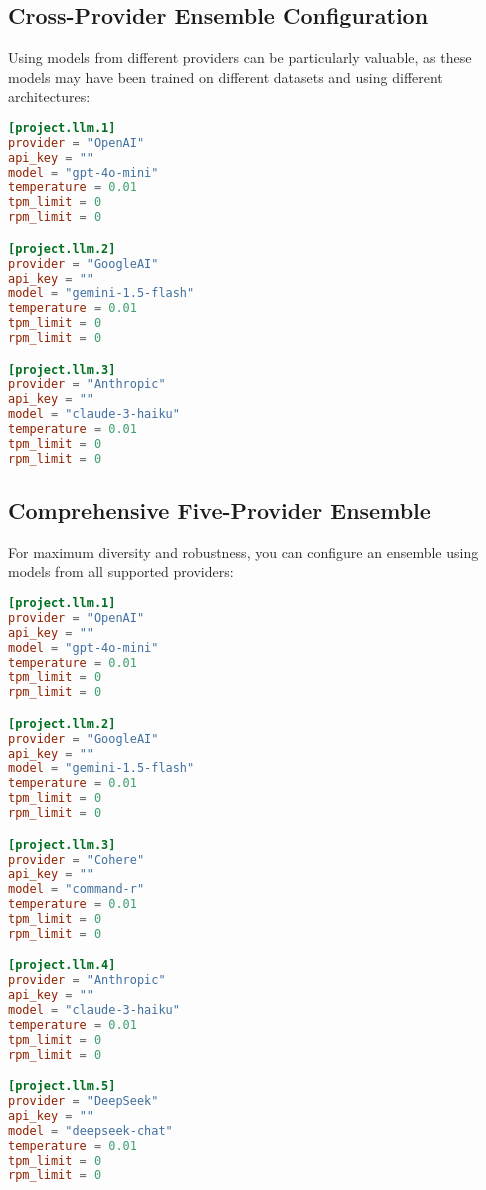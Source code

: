 
\subsection{Cross-Provider Ensemble Configuration}

Using models from different providers can be particularly valuable, as these models may have been trained on different datasets and using different architectures:

\begin{configbox}
\begin{lstlisting}[language=TOML]
[project.llm.1]
provider = "OpenAI"
api_key = ""
model = "gpt-4o-mini"
temperature = 0.01
tpm_limit = 0
rpm_limit = 0

[project.llm.2]
provider = "GoogleAI"
api_key = ""
model = "gemini-1.5-flash"
temperature = 0.01
tpm_limit = 0
rpm_limit = 0

[project.llm.3]
provider = "Anthropic"
api_key = ""
model = "claude-3-haiku"
temperature = 0.01
tpm_limit = 0
rpm_limit = 0
\end{lstlisting}
\end{configbox}


\subsection{Comprehensive Five-Provider Ensemble}

For maximum diversity and robustness, you can configure an ensemble using models from all supported providers:

\begin{configbox}
\begin{lstlisting}[language=TOML]
[project.llm.1]
provider = "OpenAI"
api_key = ""
model = "gpt-4o-mini"
temperature = 0.01
tpm_limit = 0
rpm_limit = 0

[project.llm.2]
provider = "GoogleAI"
api_key = ""
model = "gemini-1.5-flash"
temperature = 0.01
tpm_limit = 0
rpm_limit = 0

[project.llm.3]
provider = "Cohere"
api_key = ""
model = "command-r"
temperature = 0.01
tpm_limit = 0
rpm_limit = 0

[project.llm.4]
provider = "Anthropic"
api_key = ""
model = "claude-3-haiku"
temperature = 0.01
tpm_limit = 0
rpm_limit = 0

[project.llm.5]
provider = "DeepSeek"
api_key = ""
model = "deepseek-chat"
temperature = 0.01
tpm_limit = 0
rpm_limit = 0
\end{lstlisting}
\end{configbox}

